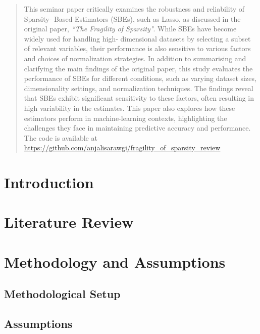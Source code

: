 \begin{abstract}
This seminar paper critically examines the robustness and reliability of Sparsity-
Based Estimators (SBEs), such as Lasso, as discussed in the original paper, \textit{``The
Fragility of Sparsity"}. While SBEs have become widely used for handling high-
dimensional datasets by selecting a subset of relevant variables, their performance
is also sensitive to various factors and choices of normalization strategies. In addition to summarising and clarifying the main findings of the original paper, this study evaluates the performance of SBEs for different conditions, such as varying dataset sizes, dimensionality settings, and normalization techniques. The findings reveal that SBEs exhibit significant sensitivity to these factors, often resulting in high variability in the estimates. This paper also explores how these estimators perform in machine-learning contexts, highlighting the challenges they face in maintaining predictive accuracy and performance. The code is available at \url{https://github.com/anjalisarawgi/fragility_of_sparsity_review}


\end{abstract}

\newpage
\tableofcontents

\newpage


    

\newpage
\section{Introduction}
\label{SDF}

\section{Literature Review}

\section{Methodology and Assumptions}

\subsection{Methodological Setup}

\subsection{Assumptions}

